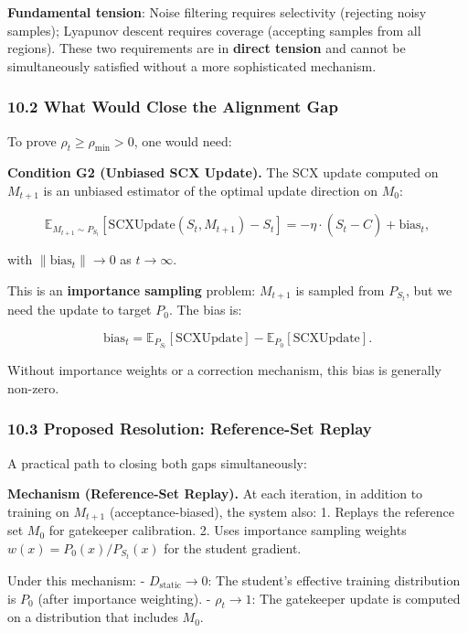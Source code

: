 \documentclass[
  12pt,
]{ctexart}
\begin{document}
\textbf{Fundamental tension}: Noise filtering requires selectivity
(rejecting noisy samples); Lyapunov descent requires coverage (accepting
samples from all regions). These two requirements are in \textbf{direct
tension} and cannot be simultaneously satisfied without a more
sophisticated mechanism.

\subsubsection{10.2 What Would Close the Alignment
Gap}\label{what-would-close-the-alignment-gap}

To prove \(\rho_t \geq \rho_{\min} > 0\), one would need:

\textbf{Condition G2 (Unbiased SCX Update).} The SCX update computed on
\(M_{t+1}\) is an unbiased estimator of the optimal update direction on
\(M_0\):

\[\mathbb{E}_{M_{t+1} \sim P_{S_t}}[\text{SCXUpdate}(S_t, M_{t+1}) - S_t] = -\eta \cdot (S_t - \hat{C}) + \text{bias}_t,\]

with \(\|\text{bias}_t\| \to 0\) as \(t \to \infty\).

This is an \textbf{importance sampling} problem: \(M_{t+1}\) is sampled
from \(P_{S_t}\), but we need the update to target \(P_0\). The bias is:

\[\text{bias}_t = \mathbb{E}_{P_{S_t}}[\text{SCXUpdate}] - \mathbb{E}_{P_0}[\text{SCXUpdate}].\]

Without importance weights or a correction mechanism, this bias is
generally non-zero.

\subsubsection{10.3 Proposed Resolution: Reference-Set
Replay}\label{proposed-resolution-reference-set-replay}

A practical path to closing both gaps simultaneously:

\textbf{Mechanism (Reference-Set Replay).} At each iteration, in
addition to training on \(M_{t+1}\) (acceptance-biased), the system
also: 1. Replays the reference set \(M_0\) for gatekeeper calibration.
2. Uses importance sampling weights \(w(x) = P_0(x) / P_{S_t}(x)\) for
the student gradient.

Under this mechanism: - \textbf{\(D_{\text{static}} \to 0\)}: The
student's effective training distribution is \(P_0\) (after importance
weighting). - \textbf{\(\rho_t \to 1\)}: The gatekeeper update is
computed on a distribution that includes \(M_0\).
\end{document}
